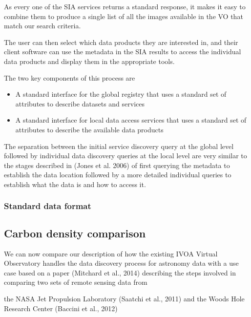 \documentclass{article}
\begin{document}
As every one of the SIA services returns a standard response, it makes it easy
to combine them to produce a single list of all the images available in the VO
that match our search criteria.

The user can then select which data products they are interested in, and their
client software can use the metadata in the SIA results to access the individual
data products and display them in the appropriate tools.

\noindent
The two key components of this process are
\begin{itemize}
  \item A standard interface for the global registry that uses a standard set of
  attributes to describe datasets and services
  \item A standard interface for local data access services that uses a standard
  set of attributes to describe the available data products
\end{itemize}

The separation between the initial service discovery query at the global
level followed by individual data discovery queries at the local level
are very similar to the stages described in (Jones et al. 2006) of first
querying the metadata to establish the data location followed by a more detailed
individual queries to establish what the data is and how to access it.

\subsubsection{Standard data format}


\subsection{Carbon density comparison}

We can now compare our description of how the existing IVOA Virtual Observatory
handles the data discovery process for astronomy data with a use case
based on a paper
(Mitchard et al., 2014)
describing the steps involved in comparing two sets of remote sensing data from

the NASA Jet Propulsion Laboratory
(Saatchi et al., 2011)
and the Woods Hole Research Center
(Baccini et al., 2012)
\end{document}
